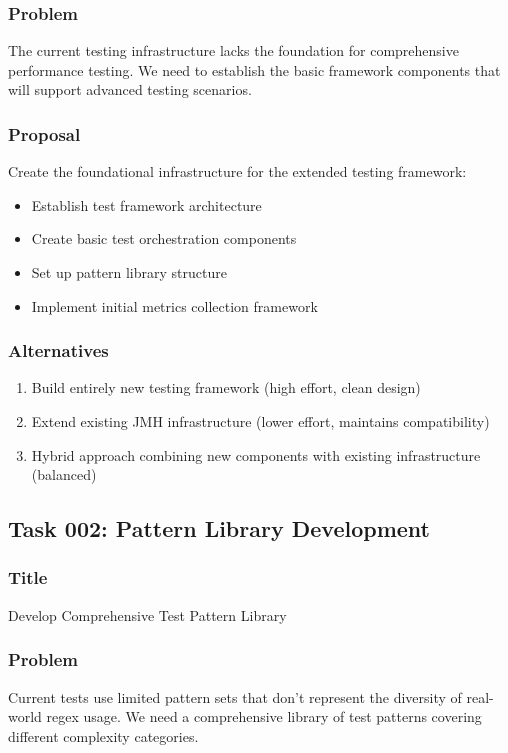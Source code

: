 \documentclass[11pt,a4paper]{article}
\begin{document}
\subsubsection{Problem}
The current testing infrastructure lacks the foundation for comprehensive performance testing. We need to establish the basic framework components that will support advanced testing scenarios.

\subsubsection{Proposal}
Create the foundational infrastructure for the extended testing framework:
\begin{itemize}
    \item Establish test framework architecture
    \item Create basic test orchestration components
    \item Set up pattern library structure
    \item Implement initial metrics collection framework
\end{itemize}

\subsubsection{Alternatives}
\begin{enumerate}
    \item Build entirely new testing framework (high effort, clean design)
    \item Extend existing JMH infrastructure (lower effort, maintains compatibility)
    \item Hybrid approach combining new components with existing infrastructure (balanced)
\end{enumerate}

\subsection{Task 002: Pattern Library Development}

\subsubsection{Title}
Develop Comprehensive Test Pattern Library

\subsubsection{Problem}
Current tests use limited pattern sets that don't represent the diversity of real-world regex usage. We need a comprehensive library of test patterns covering different complexity categories.
\end{document}
